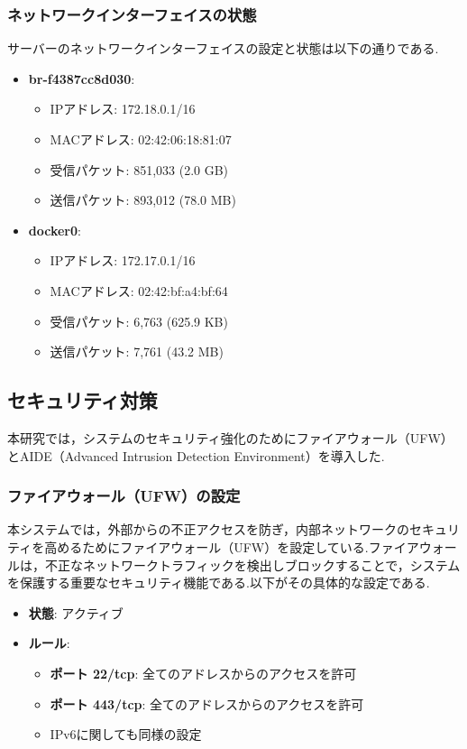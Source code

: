 \documentclass[b5paper,12pt,dvipdfmx]{jsreport}
\begin{document}
\subsubsection{ネットワークインターフェイスの状態}
サーバーのネットワークインターフェイスの設定と状態は以下の通りである.
\begin{itemize}
    \item \textbf{br-f4387cc8d030}:
    \begin{itemize}
        \item IPアドレス: 172.18.0.1/16
        \item MACアドレス: 02:42:06:18:81:07
        \item 受信パケット: 851,033 (2.0 GB)
        \item 送信パケット: 893,012 (78.0 MB)
    \end{itemize}

    \item \textbf{docker0}:
    \begin{itemize}
        \item IPアドレス: 172.17.0.1/16
        \item MACアドレス: 02:42:bf:a4:bf:64
        \item 受信パケット: 6,763 (625.9 KB)
        \item 送信パケット: 7,761 (43.2 MB)
    \end{itemize}
\end{itemize}


\subsection{セキュリティ対策}

本研究では，システムのセキュリティ強化のためにファイアウォール（UFW）とAIDE（Advanced Intrusion Detection Environment）を導入した.

\subsubsection{ファイアウォール（UFW）の設定}
本システムでは，外部からの不正アクセスを防ぎ，内部ネットワークのセキュリティを高めるためにファイアウォール（UFW）を設定している.ファイアウォールは，不正なネットワークトラフィックを検出しブロックすることで，システムを保護する重要なセキュリティ機能である.以下がその具体的な設定である.

\begin{itemize}
    \item \textbf{状態}: アクティブ
    \item \textbf{ルール}:
    \begin{itemize}
        \item \textbf{ポート 22/tcp}: 全てのアドレスからのアクセスを許可
        \item \textbf{ポート 443/tcp}: 全てのアドレスからのアクセスを許可
        \item IPv6に関しても同様の設定
    \end{itemize}
\end{itemize}
\end{document}
